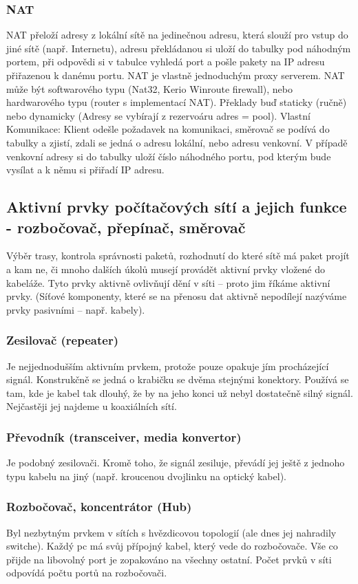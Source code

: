 \subsubsection{NAT}
NAT přeloží adresy z lokální sítě na jedinečnou adresu, která slouží pro vstup do jiné sítě (např. Internetu), adresu překládanou si uloží do tabulky pod náhodným portem, při odpovědi si v tabulce vyhledá port a pošle pakety na IP adresu přiřazenou k danému portu. NAT je vlastně jednoduchým proxy serverem. NAT může být softwarového typu (Nat32, Kerio Winroute firewall), nebo hardwarového typu (router s implementací NAT). Překlady buď staticky (ručně) nebo dynamicky (Adresy se vybírají z rezervoáru adres = pool).
Vlastní Komunikace: Klient odešle požadavek na komunikaci, směrovač se podívá do tabulky a zjistí, zdali se jedná o adresu lokální, nebo adresu venkovní. V případě venkovní adresy si do tabulky uloží číslo náhodného portu, pod kterým bude vysílat a k němu si přiřadí IP adresu.

\subsection{Aktivní prvky počítačových sítí a jejich funkce - rozbočovač, přepínač, směrovač}
Výběr trasy, kontrola správnosti paketů, rozhodnutí do které sítě má paket projít a kam ne, či mnoho dalších úkolů musejí provádět aktivní prvky vložené do kabeláže. 
Tyto prvky aktivně ovlivňují dění v síti – proto jim říkáme aktivní prvky. (Síťové komponenty, které se na přenosu dat aktivně nepodílejí nazýváme prvky pasivními – např. kabely).
\subsubsection{Zesilovač (repeater)}
Je nejjednodušším aktivním prvkem, protože pouze opakuje jím procházející signál. Konstrukčně se jedná o krabičku se dvěma stejnými konektory. Používá se tam, kde je kabel tak dlouhý, že by na jeho konci už nebyl dostatečně silný signál. Nejčastěji jej najdeme u koaxiálních sítí.
\subsubsection{Převodník (transceiver, media konvertor)}
Je podobný zesilovači. Kromě toho, že signál zesiluje, převádí jej ještě z jednoho typu kabelu na jiný (např. kroucenou dvojlinku na optický kabel).
\subsubsection{Rozbočovač, koncentrátor (Hub)}
Byl nezbytným prvkem v sítích s hvězdicovou topologií (ale dnes jej nahradily switche). Každý pc má svůj přípojný kabel, který vede do rozbočovače. Vše co přijde na libovolný port je zopakováno na všechny ostatní. Počet prvků v síti odpovídá počtu portů na rozbočovači.  

